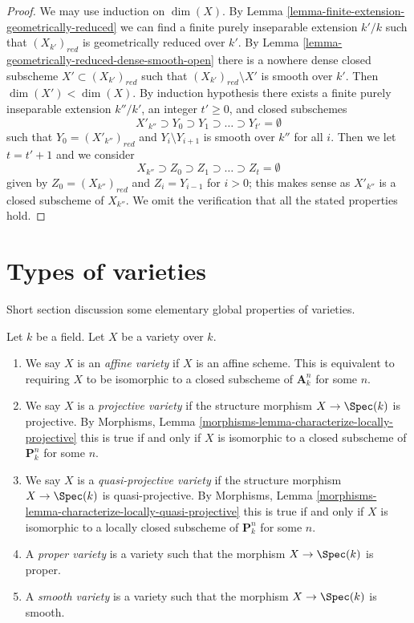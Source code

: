 \begin{proof}
We may use induction on $\dim(X)$. By
Lemma \ref{lemma-finite-extension-geometrically-reduced}
we can find a finite purely inseparable extension $k'/k$
such that $(X_{k'})_{red}$ is geometrically reduced over $k'$.
By Lemma \ref{lemma-geometrically-reduced-dense-smooth-open}
there is a nowhere dense closed subscheme $X' \subset (X_{k'})_{red}$
such that $(X_{k'})_{red} \setminus X'$ is smooth over $k'$.
Then $\dim(X') < \dim(X)$. By induction hypothesis there exists
a finite purely inseparable extension $k''/k'$,
an integer $t' \geq 0$, and closed subschemes
$$
X'_{k''} \supset Y_0 \supset Y_1 \supset \ldots \supset Y_{t'} = \emptyset
$$
such that $Y_0 = (X'_{k''})_{red}$ and $Y_i \setminus Y_{i + 1}$
is smooth over $k''$ for all $i$. Then we let $t = t' + 1$
and we consider
$$
X_{k''} \supset Z_0 \supset Z_1 \supset \ldots \supset Z_t = \emptyset
$$
given by $Z_0 = (X_{k''})_{red}$ and $Z_i = Y_{i - 1}$ for $i > 0$;
this makes sense as $X'_{k''}$ is a closed subscheme of $X_{k''}$.
We omit the verification that all the stated properties hold.
\end{proof}




\section{Types of varieties}
\label{section-types}

\noindent
Short section discussion some elementary global properties of varieties.

\begin{definition}
\label{definition-variety-type}
Let $k$ be a field. Let $X$ be a variety over $k$.
\begin{enumerate}
\item We say $X$ is an {\it affine variety} if $X$ is an affine scheme.
This is equivalent to requiring $X$ to be isomorphic to a closed
subscheme of $\mathbf{A}^n_k$ for some $n$.
\item We say $X$ is a {\it projective variety} if the
structure morphism $X \to \Spec(k)$ is projective. By
Morphisms, Lemma \ref{morphisms-lemma-characterize-locally-projective}
this is true if and only if $X$ is isomorphic to a closed
subscheme of $\mathbf{P}^n_k$ for some $n$.
\item We say $X$ is a {\it quasi-projective variety} if
the structure morphism $X \to \Spec(k)$ is quasi-projective. By
Morphisms, Lemma \ref{morphisms-lemma-characterize-locally-quasi-projective}
this is true if and only if $X$ is isomorphic to a
locally closed subscheme of $\mathbf{P}^n_k$ for some $n$.
\item A {\it proper variety} is a variety such that the
morphism $X \to \Spec(k)$ is proper.
\item A {\it smooth variety} is a variety such that the
morphism $X \to \Spec(k)$ is smooth.
\end{enumerate}
\end{definition}

